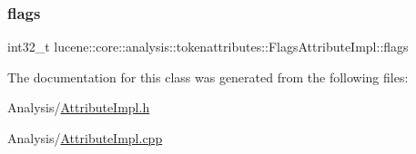 \subsubsection{\texorpdfstring{flags}{flags}}
{\footnotesize\ttfamily int32\+\_\+t lucene\+::core\+::analysis\+::tokenattributes\+::\+Flags\+Attribute\+Impl\+::flags\hspace{0.3cm}{\ttfamily [private]}}



The documentation for this class was generated from the following files\+:\begin{DoxyCompactItemize}
\item 
Analysis/\mbox{\hyperlink{AttributeImpl_8h}{Attribute\+Impl.\+h}}\item 
Analysis/\mbox{\hyperlink{AttributeImpl_8cpp}{Attribute\+Impl.\+cpp}}\end{DoxyCompactItemize}
